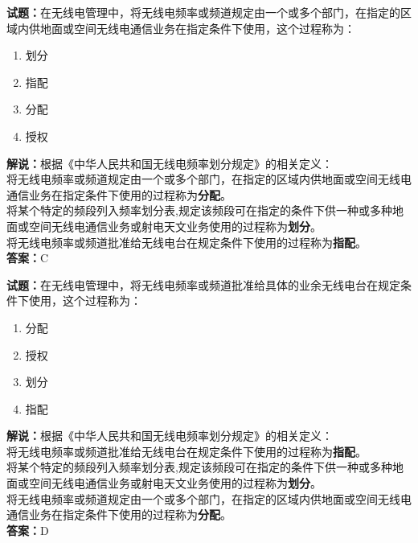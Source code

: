 \documentclass{ctexbook}
\begin{document}
\vspace{1em}

\textbf{试题：}在无线电管理中，将无线电频率或频道规定由一个或多个部门，在指定的区域内供地面或空间无线电通信业务在指定条件下使用，这个过程称为：
\begin{enumerate}[leftmargin=3em]
  \item 划分
  \item 指配
  \item 分配
  \item 授权
\end{enumerate}
\noindent\textbf{解说：}根据《中华人民共和国无线电频率划分规定》的相关定义：\\将无线电频率或频道规定由一个或多个部门，在指定的区域内供地面或空间无线电通信业务在指定条件下使用的过程称为\textbf{分配}。\\将某个特定的频段列入频率划分表,规定该频段可在指定的条件下供一种或多种地面或空间无线电通信业务或射电天文业务使用的过程称为\textbf{划分}。\\将无线电频率或频道批准给无线电台在规定条件下使用的过程称为\textbf{指配}。\\
\textbf{答案：}C

\vspace{1em}

\textbf{试题：}在无线电管理中，将无线电频率或频道批准给具体的业余无线电台在规定条件下使用，这个过程称为：
\begin{enumerate}[leftmargin=3em]
  \item 分配
  \item 授权
  \item 划分
  \item 指配
\end{enumerate}
\noindent\textbf{解说：}根据《中华人民共和国无线电频率划分规定》的相关定义：\\将无线电频率或频道批准给无线电台在规定条件下使用的过程称为\textbf{指配}。\\将某个特定的频段列入频率划分表,规定该频段可在指定的条件下供一种或多种地面或空间无线电通信业务或射电天文业务使用的过程称为\textbf{划分}。\\将无线电频率或频道规定由一个或多个部门，在指定的区域内供地面或空间无线电通信业务在指定条件下使用的过程称为\textbf{分配}。\\
\textbf{答案：}D

\vspace{1em}
\end{document}
